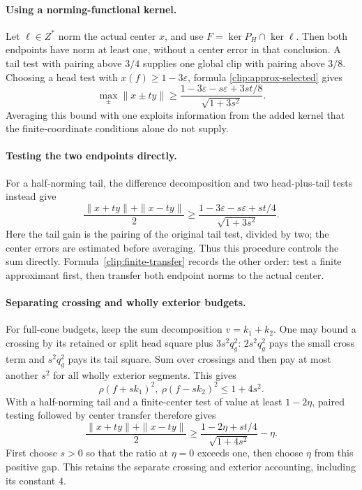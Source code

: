 \paragraph{Using a norming-functional kernel.}\label{clip:norming-kernel}
Let $\ell\in Z^*$ norm the actual center $x$, and use
$F=\ker P_H\cap\ker\ell$. Then both endpoints have norm at least
one, without a center error in that conclusion. A tail test with
pairing above $3/4$ supplies one global clip with pairing above $3/8$.
Choosing a head test with $x(f)\ge1-3\varepsilon$, formula
\eqref{clip:approx-selected} gives
\[
 \max_\pm\|x\pm ty\|\ge
 \frac{1-3\varepsilon-s\varepsilon+3st/8}{\sqrt{1+3s^2}}.
\]
Averaging this bound with one exploits information from the added
kernel that the finite-coordinate conditions alone do not supply.

\paragraph{Testing the two endpoints directly.}\label{clip:direct-paired}
For a half-norming tail, the difference decomposition and two head-plus-tail
tests instead give
\[
 \frac{\|x+ty\|+\|x-ty\|}{2}
 \ge\frac{1-3\varepsilon-s\varepsilon+st/4}{\sqrt{1+3s^2}}.
\]
Here the tail gain is the pairing of the original tail test, divided
by two; the center errors are estimated before averaging. Thus this
procedure controls the sum directly. Formula~\eqref{clip:finite-transfer}
records the other order: test a finite approximant first, then transfer
both endpoint norms to the actual center.

\paragraph{Separating crossing and wholly exterior budgets.}
\label{clip:constant-four}
For full-cone budgets, keep the sum decomposition $v=k_1+k_2$.
One may bound a crossing by its retained or split head square plus
$3s^2q_g^2$: $2s^2q_g^2$ pays the small cross term and
$s^2q_g^2$ pays its tail square. Sum over crossings and then pay
at most another $s^2$ for all wholly exterior segments. This gives
\[
 \rho(f+sk_1)^2,\ \rho(f-sk_2)^2\le1+4s^2.
\]
With a half-norming tail and a finite-center test of value at least
$1-2\eta$, paired testing followed by center transfer therefore gives
\[
 \frac{\|x+ty\|+\|x-ty\|}{2}
 \ge\frac{1-2\eta+st/4}{\sqrt{1+4s^2}}-\eta.
\]
First choose $s>0$ so that the ratio at $\eta=0$ exceeds one,
then choose $\eta$ from this positive gap. This retains the separate
crossing and exterior accounting, including its constant $4$.


